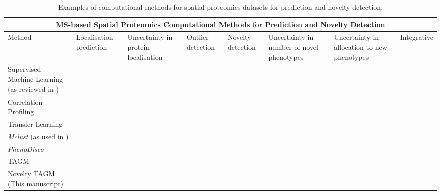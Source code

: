 \documentclass[12pt,english]{article}
\newcommand{\xmark}{\ding{55}}
\begin{document}
\begin{table}[h]
	\centering
	\footnotesize
	\hspace*{-1.5cm}
	\begin{tabular}{ |p{2.5cm}|p{2cm}|p{2cm}|p{1.5cm}|p{2cm}|p{2cm}|p{2cm}|p{2cm}|}
		\hline
		\multicolumn{8}{|c|}{MS-based Spatial Proteomics Computational Methods for Prediction and Novelty Detection} \\
		\hline
		Method & Localisation prediction & Uncertainty in protein localisation & Outlier detection  & Novelty detection & Uncertainty in number of novel phenotypes & Uncertainty in allocation to new phenotypes & Integrative \\
		\hline
		\hline
		Supervised Machine Learning (as reviewed in \cite{Gatto:2014b})  & \vfill\hfil \checkmark & \vfill\hfil\xmark & \vfill\hfil\xmark &\vfill\hfil\xmark&\vfill\hfil\xmark&\vfill \hfil\xmark& \vfill\hfil\xmark\\
		\hline
		Correlation Profiling \citep{Foster:2006, Krahmer::2018}  & \vfill\hfil \checkmark & \vfill\hfil\xmark & \vfill\hfil\xmark &\vfill\hfil\xmark&\vfill\hfil\xmark&\vfill\hfil\xmark& \vfill\hfil\xmark\\
		\hline
		Transfer Learning \citep{Breckels:2016}  & \vfill\hfil \checkmark  & \vfill\hfil\xmark& \vfill\hfil\xmark &\vfill\hfil\xmark&\vfill\hfil\xmark& \vfill\hfil\xmark&\vfill\hfil \checkmark\\
		\hline
		\textit{Mclust} (as used in \cite{Orre:2019}) & \vfill\hfil\xmark &\vfill\hfil\xmark &\vfill\hfil \checkmark &\vfill\hfil \checkmark&\vfill\hfil\xmark&\vfill\hfil\xmark& \vfill\hfil\xmark\\
		\hline
		\textit{PhenoDisco} \citep{Breckels:2013}  & \vfill\hfil\xmark &\vfill\hfil\xmark &\vfill\hfil \checkmark &\vfill\hfil \checkmark&\vfill\hfil\xmark&\vfill\hfil\xmark& \vfill\hfil\xmark\\
		\hline
		TAGM \citep{Crook:2018}& \vfill\hfil \checkmark & \vfill\hfil \checkmark & \vfill\hfil \checkmark& \vfill\hfil\xmark&\vfill\hfil\xmark&\vfill\hfil\xmark&\vfill\hfil\xmark\\
		\hline
		Novelty TAGM (This manuscript)&  \vfill\hfil \checkmark & \vfill\hfil \checkmark &\vfill\hfil \checkmark & \vfill\hfil \checkmark&\vfill\hfil \checkmark&\vfill\hfil \checkmark& \vfill\hfil\xmark\\
		\hline
		\hline
	\end{tabular}
	\caption{Examples of computational methods for spatial proteomics datasets for prediction and novelty detection.}
	\label{table:methods}
\end{table}
\end{document}
